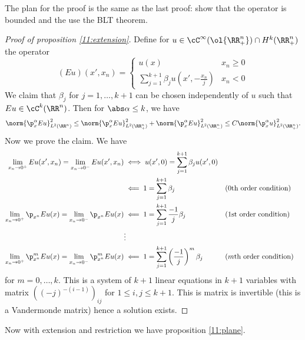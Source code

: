 The plan for the proof is the same as the last proof: show that the operator is bounded and the use the BLT theorem.

\begin{proof}[Proof of proposition \ref{11:extension}]
  Define for $u \in \cC^\infty(\ol{\RR_+^n}) \cap H^k(\RR_+^n)$ the operator
  \begin{equation*}
    (Eu)(x',x_n)=
      \begin{cases}
	u(x) & x_n \geq 0 \\
	\sum_{j=1}^{k+1} \beta_j u\left( x',-\frac{x_n}j \right) & x_n < 0
      \end{cases}
  \end{equation*}
  We claim that $\beta_j$ for $j=1,\ldots,k+1$ can be chosen independently of $u$ such that $Eu \in \cC^k(\RR^n)$.
  Then for $\abs\alpha\leq k$, we have
  \[ \norm{\p_x^\alpha Eu}_{L^2(\RR^n)}^2 \leq \norm{\p_x^\alpha Eu}_{L^2(\RR_+^n)}^2 + \norm{\p_x^\alpha Eu}_{L^2(\RR_-^n)}^2 \leq C\norm{\p_x^\alpha u}_{L^2(\RR_+^n)}^2. \]
  Now we prove the claim.
  We have
  \begin{align*}
    \lim_{x_n\to0^+}Eu(x',x_n) = \lim_{x_n\to0^-}Eu(x',x_n) &\iff u(x',0) = \sum_{j=1}^{k+1} \beta_j u(x',0) \\
    &\impliedby 1 = \sum_{j=1}^{k+1} \beta_j && \text{(0th order condition)} \\
    \lim_{x_n\to0^+}\p_{x^n}Eu(x) = \lim_{x_n\to0^-}\p_{x^n}Eu(x) &\impliedby 1 = \sum_{j=1}^{k+1} \frac{-1}{j} \beta_j && \text{(1st order condition)} \\
    &\vdots \\
    \lim_{x_n\to0^+}\p_{x^n}^mEu(x) = \lim_{x_n\to0^-}\p_{x^n}^mEu(x) &\impliedby 1 = \sum_{j=1}^{k+1} \left(\frac{-1}{j}\right)^m \beta_j && \text{($m$th order condition)}
  \end{align*}
  for $m=0,\ldots,k$.
  This is a system of $k+1$ linear equations in $k+1$ variables with matrix $\left( (-j)^{-(i-1)} \right)_{ij}$ for $1\leq i,j \leq k+1$.
  This is matrix is invertible (this is a Vandermonde matrix) hence a solution exists.
\end{proof}

Now with extension and restriction we have proposition \ref{11:plane}.


